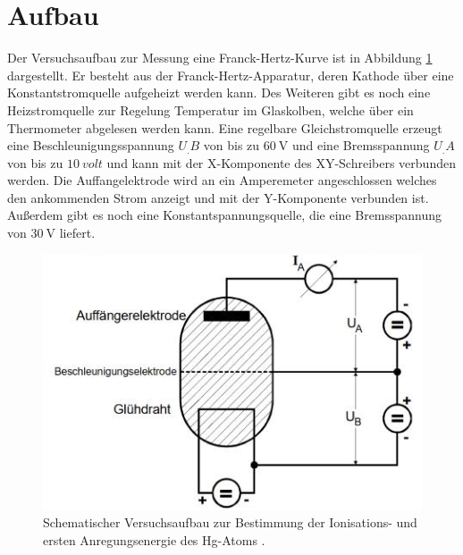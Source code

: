 \section{Aufbau}
\label{sec:Aufbau}
Der Versuchsaufbau zur Messung eine Franck-Hertz-Kurve ist in Abbildung \ref{fig:aufbau} dargestellt.
Er besteht aus der Franck-Hertz-Apparatur, deren Kathode über eine Konstantstromquelle aufgeheizt werden kann.
Des Weiteren gibt es noch eine Heizstromquelle zur Regelung Temperatur im Glaskolben, welche über ein Thermometer abgelesen werden kann. Eine regelbare Gleichstromquelle erzeugt eine Beschleunigungsspannung $U_.B$ von bis zu $\SI{60}{\volt}$ und eine Bremsspannung $U_.A$ von bis zu $\SI{10}{volt}$ und kann mit der X-Komponente des XY-Schreibers verbunden werden. Die Auffangelektrode wird an ein Amperemeter angeschlossen welches den ankommenden Strom anzeigt und mit der Y-Komponente verbunden ist. Außerdem gibt es noch eine Konstantspannungsquelle, die eine Bremsspannung von $\SI{30}{\volt}$ liefert.

\begin{figure}
\includegraphics[width=\linewidth-50pt,height=\textheight-50pt,keepaspectratio]{content/images/apparatur.jpg}
\caption{Schematischer Versuchsaufbau zur Bestimmung der Ionisations- und ersten Anregungsenergie des Hg-Atoms \cite{V601}.}
\label{fig:aufbau}
\end{figure}
